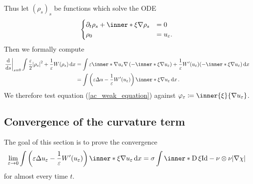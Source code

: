 Thus let $ ( \rho_{ s } )_{ s } $ be functions which solve the ODE
\[
	\begin{cases}
	\partial_{ t } \rho_{ s } 
	+
	\inner*{ \xi }{ \nabla \rho_{ s } }
	& = 0
	\\
	\rho_{ 0 } & = u_{ \varepsilon }.
	\end{cases}
\]
Then we formally compute 
\begin{align*}
	\left.\dv{ s }\right|_{ s = 0 }
		\int
			\frac{ \varepsilon }{ 2 }
			\abs{ \rho_{ s } }^{ 2 }
			+
			\frac{ 1 }{ \varepsilon }
			W ( \rho_{ s } )
		\dd{ x }
	& =
	\int
		\varepsilon 
		\inner*{ \nabla u_{ \varepsilon } }
		{ \nabla \left( - \inner*{ \xi }{ \nabla u_{ \varepsilon } } \right) }
		+
		\frac{ 1 }{ \varepsilon }
		W'( u_{ \varepsilon } ) ( -\inner*{ \xi }{ \nabla u_{ \varepsilon } } )
	\dd{ x }
	\\
	& =
	\int
		\left(
			\varepsilon \Delta u - \frac{ 1 }{ \varepsilon } W'( u_{ \varepsilon } )
		\right)
		\inner*{ \xi }{ \nabla u_{ \varepsilon } } 
	\dd{ x }.
\end{align*}
We therefore test equation (\ref{ac_weak_equation}) against $ \varphi_{ \varepsilon } \coloneqq \inner{ \xi }{ \nabla u_{ \varepsilon } } $.

\subsection{Convergence of the curvature term}

The goal of this section is to prove the convergence
\begin{equation*}
	\lim_{ \varepsilon \to 0 }
		\int
			\left(
				\varepsilon \Delta u_{ \varepsilon }
				- 
				\frac{ 1 }{ \varepsilon }
				W'( u_{ \varepsilon } )
			\right)
			\inner*{ \xi }{ \nabla u_{ \varepsilon } }
		\dd{ x }
	=
	\sigma
	\int
		\inner*{ \diff \xi }{ \mathrm{Id} - \nu \otimes \nu }
	\abs{ \nabla \chi }
\end{equation*} 
for almost every time $ t $.